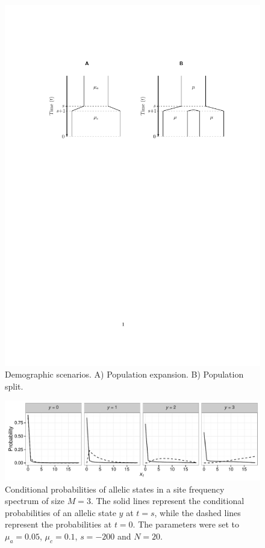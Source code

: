 \documentclass[preprint]{elsarticle}
\newcommand\y{\ensuremath{y}}
\begin{document}
\begin{figure}[ht]
\includegraphics[width = 12cm]{diags.pdf}
\caption{Demographic scenarios. A) Population expansion. B) Population split.}\label{diag}
\end{figure}

\begin{figure}[ht]
\includegraphics[width = 12cm]{cProb_27_2_2017.pdf}
\caption{Conditional probabilities of allelic states in a site frequency spectrum of size $M=3$. The solid lines represent the conditional probabilities of an allelic state $\y$ at $t=s$, while the dashed lines represent the probabilities at $t=0$. The parameters were set to $\mu_a=0.05$, $\mu_c=0.1$, $s=-200$ and $N=20$.}\label{cProb}
\end{figure}
\end{document}
